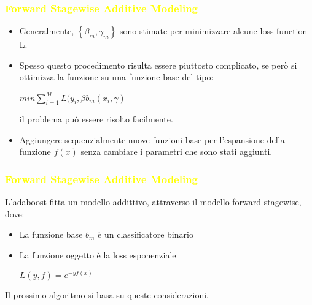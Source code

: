 \documentclass[handout
]{beamer}
\def\yellow#1{{\textcolor{yellow}{#1}}}
\begin{document}
\begin{frame}
\frametitle{\yellow{Forward Stagewise Additive Modeling}}
\begin{itemize}
 \item Generalmente, \begin{math} \left\{ \beta_m,\gamma_m\right\}\end{math} sono stimate per minimizzare alcune
loss function L.
\item Spesso questo procedimento 
risulta essere piuttosto complicato, se per\`o si ottimizza la funzione su una funzione base del tipo:
\begin{center}
 \begin{math}
  min \sum_{i=1}^M L(y_i,\beta b_m(x_i,\gamma)
 \end{math}
\end{center}
il problema pu\`o essere risolto facilmente.
\item Aggiungere sequenzialmente nuove funzioni base 
per l'espansione della funzione \begin{math}f(x)\end{math} senza cambiare i parametri che sono stati aggiunti.
\end{itemize}

\end{frame}

\begin{frame}
\frametitle{\yellow{Forward Stagewise Additive Modeling}}
L'adaboost fitta un modello addittivo, attraverso il modello forward stagewise, dove:
\begin{itemize}
 \item La funzione base \begin{math}b_m\end{math} \`e un classificatore binario
 \item La funzione oggetto \`e la loss esponenziale
\begin{center}
\begin{math} L(y,f) = e^{-yf(x)} \end{math}
\end{center}
\end{itemize}
Il prossimo algoritmo si basa su queste considerazioni.
\end{frame}
\end{document}
